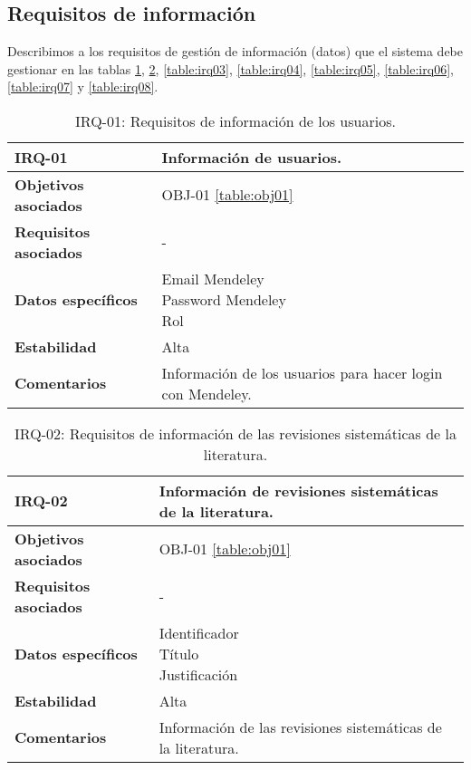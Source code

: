 \subsection{Requisitos de información}
Describimos a los requisitos de gestión de información (datos) que el sistema debe gestionar en las tablas \ref{table:irq01}, \ref{table:irq02}, \ref{table:irq03}, \ref{table:irq04}, \ref{table:irq05}, \ref{table:irq06}, \ref{table:irq07} y \ref{table:irq08}.

\begin{table}[!hbt]
	\begin{center}
		\begin{tabular}{|p{5cm}|p{10cm}|}
			\hline
			\textbf{IRQ-01} & Información de usuarios.\\
			\hline
			\textbf{Objetivos asociados} & OBJ-01 \ref{table:obj01}\\
			\hline
			\textbf{Requisitos asociados} & -\\
			\hline
			\textbf{Datos específicos} & \shortstack[l]{Email Mendeley \\ Password Mendeley \\ Rol} \\
			\hline
			\textbf{Estabilidad} & Alta\\
			\hline
			\textbf{Comentarios} & Información de los usuarios para hacer login con Mendeley.\\
			\hline
		\end{tabular}
		\caption{IRQ-01: Requisitos de información de los usuarios.}
		\label{table:irq01}
	\end{center}
\end{table}

\begin{table}[!hbt]
	\begin{center}
		\begin{tabular}{|p{5cm}|p{10cm}|}
			\hline
			\textbf{IRQ-02} & Información de revisiones sistemáticas de la literatura.\\
			\hline
			\textbf{Objetivos asociados} & OBJ-01 \ref{table:obj01}\\
			\hline
			\textbf{Requisitos asociados} & -\\
			\hline
			\textbf{Datos específicos} & \shortstack[l]{Identificador \\ Título \\ Justificación} \\
			\hline
			\textbf{Estabilidad} & Alta\\
			\hline
			\textbf{Comentarios} & Información de las revisiones sistemáticas de la literatura.\\
			\hline
		\end{tabular}
		\caption{IRQ-02: Requisitos de información de las revisiones sistemáticas de la literatura.}
		\label{table:irq02}
	\end{center}
\end{table}

